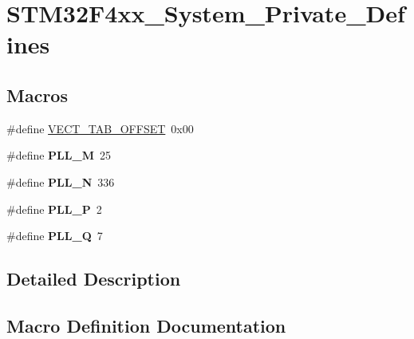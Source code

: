 \hypertarget{group___s_t_m32_f4xx___system___private___defines}{}\section{S\+T\+M32\+F4xx\+\_\+\+System\+\_\+\+Private\+\_\+\+Defines}
\label{group___s_t_m32_f4xx___system___private___defines}
\subsection*{Macros}
\begin{DoxyCompactItemize}
\item 
\#define \hyperlink{group___s_t_m32_f4xx___system___private___defines_ga40e1495541cbb4acbe3f1819bd87a9fe}{V\+E\+C\+T\+\_\+\+T\+A\+B\+\_\+\+O\+F\+F\+S\+E\+T}~0x00
\item 
\hypertarget{group___s_t_m32_f4xx___system___private___defines_ga0fa5a868f5cd056a04b1c42e454b9617}{}\#define {\bfseries P\+L\+L\+\_\+\+M}~25\label{group___s_t_m32_f4xx___system___private___defines_ga0fa5a868f5cd056a04b1c42e454b9617}

\item 
\hypertarget{group___s_t_m32_f4xx___system___private___defines_ga04586ea638d21afe558db4f2798c38a6}{}\#define {\bfseries P\+L\+L\+\_\+\+N}~336\label{group___s_t_m32_f4xx___system___private___defines_ga04586ea638d21afe558db4f2798c38a6}

\item 
\hypertarget{group___s_t_m32_f4xx___system___private___defines_ga290dcd27167e925d817e8334111c1c01}{}\#define {\bfseries P\+L\+L\+\_\+\+P}~2\label{group___s_t_m32_f4xx___system___private___defines_ga290dcd27167e925d817e8334111c1c01}

\item 
\hypertarget{group___s_t_m32_f4xx___system___private___defines_gac958257ddb2537c539cffdb3a4543067}{}\#define {\bfseries P\+L\+L\+\_\+\+Q}~7\label{group___s_t_m32_f4xx___system___private___defines_gac958257ddb2537c539cffdb3a4543067}

\end{DoxyCompactItemize}


\subsection{Detailed Description}


\subsection{Macro Definition Documentation}
\hypertarget{group___s_t_m32_f4xx___system___private___defines_ga40e1495541cbb4acbe3f1819bd87a9fe}{}
